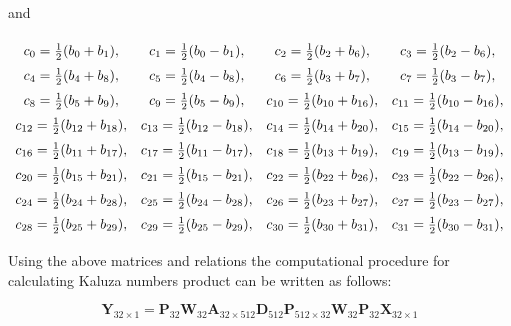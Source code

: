\documentclass{jtacs}
\numberwithin{equation}{section}
\begin{document}
and

\begin{center}
\begin{adjustbox}{width=0.77\textwidth, margin=0 10 0 10}
$
\begin{array}{cccc}
\renewcommand*{\arraystretch}{1.5}
\begin{matrix}
c_{0}=\frac{1}{2}(b_{0}+b_{1}),   &    c_{1}=\frac{1}{2}(b_{0}-b_{1}), &  c_{2}=\frac{1}{2}(b_{2}+b_{6}),     & c_{3}=\frac{1}{2}(b_{2}-b_{6}), \\
c_{4}=\frac{1}{2}(b_{4}+b_{8}),  &     c_{5}=\frac{1}{2}(b_{4}-b_{8}),	& c_{6}=\frac{1}{2}(b_{3}+b_{7}),     & c_{7}=\frac{1}{2}(b_{3}-b_{7}), \\
c_{8}=\frac{1}{2}(b_{5}+b_{9}),     &  c_{9}=\frac{1}{2}(b_{5}-b_{9}),	& c_{10}=\frac{1}{2}(b_{10}+b_{16}),& c_{11}=\frac{1}{2}(b_{10}-b_{16}), \\
c_{12}=\frac{1}{2}(b_{12}+b_{18}),& c_{13}=\frac{1}{2}(b_{12}-b_{18}),& c_{14}=\frac{1}{2}(b_{14}+b_{20}),& c_{15}=\frac{1}{2}(b_{14}-b_{20}), \\
c_{16}=\frac{1}{2}(b_{11}+b_{17}),& c_{17}=\frac{1}{2}(b_{11}-b_{17}),& c_{18}=\frac{1}{2}(b_{13}+b_{19}),& c_{19}=\frac{1}{2}(b_{13}-b_{19}), \\
c_{20}=\frac{1}{2}(b_{15}+b_{21}), &c_{21}=\frac{1}{2}(b_{15}-b_{21}), &c_{22}=\frac{1}{2}(b_{22}+b_{26}),& c_{23}=\frac{1}{2}(b_{22}-b_{26}), \\
c_{24}=\frac{1}{2}(b_{24}+b_{28}),& c_{25}=\frac{1}{2}(b_{24}-b_{28}), &c_{26}=\frac{1}{2}(b_{23}+b_{27}),& c_{27}=\frac{1}{2}(b_{23}-b_{27}), \\
c_{28}=\frac{1}{2}(b_{25}+b_{29}),& c_{29}=\frac{1}{2}(b_{25}-b_{29}), &c_{30}=\frac{1}{2}(b_{30}+b_{31}),& c_{31}=\frac{1}{2}(b_{30}-b_{31}),
\end{matrix}
\end{array}
$
\end{adjustbox}
\end{center}

Using the above matrices and relations the computational procedure for calculating Kaluza numbers product can be written as follows:

\begin{equation}
\mathbf{Y}_{32\times1}=\mathbf{P}_{32}\mathbf{W}_{32}\mathbf{A}_{32\times512}\mathbf{D}_{512}\mathbf{P}_{512\times32}\mathbf{W}_{32}\mathbf{P}_{32}\mathbf{X}_{32\times1}
\label{6}
\end{equation}

\begin{adjustbox}{margin = 0 0 0 8}
\end{adjustbox}
\end{document}
